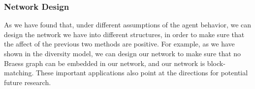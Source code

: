 \subsubsection{Network Design}

As we have found that, under different assumptions of the agent behavior, we can design the network we have into different structures, in order to make sure that the affect of the previous two methods are positive. For example, as we have shown in the diversity model, we can design our network to make sure that no Braess graph can be embedded in our network, and our network is block-matching.
These important applications also point at the directions for potential future research. 

